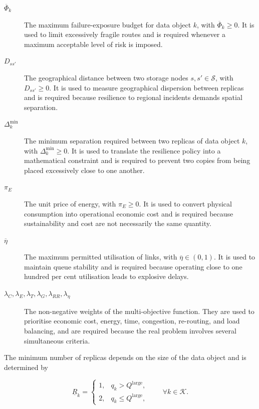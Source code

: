 \documentclass[a4paper,fleqn]{cas-dc}
\newcommand{\Sset}{\mathcal{S}}
\newcommand{\Kset}{\mathcal{K}}
\begin{document}
\begin{description}
\item[\(\overline\Phi_k\)] The maximum failure-exposure budget for data object \(k\), with \(\overline\Phi_k\ge 0\). It is used to limit excessively fragile routes and is required whenever a maximum acceptable level of risk is imposed. 

\item[\(D_{ss'}\)] The geographical distance between two storage nodes \(s,s'\in\Sset\), with \(D_{ss'}\ge 0\). It is used to measure geographical dispersion between replicas and is required because resilience to regional incidents demands spatial separation. 

\item[\(\Delta_k^{\min}\)] The minimum separation required between two replicas of data object \(k\), with \(\Delta_k^{\min}\ge 0\). It is used to translate the resilience policy into a mathematical constraint and is required to prevent two copies from being placed excessively close to one another. 

\item[\(\pi_E\)] The unit price of energy, with \(\pi_E\ge 0\). It is used to convert physical consumption into operational economic cost and is required because sustainability and cost are not necessarily the same quantity. 

\item[\(\overline\eta\)] The maximum permitted utilisation of links, with \(\overline\eta\in(0,1)\). It is used to maintain queue stability and is required because operating close to one hundred per cent utilisation leads to explosive delays. 

\item[\(\lambda_C,\lambda_E,\lambda_T,\lambda_G,\lambda_{RR},\lambda_{\eta}\)] The non-negative weights of the multi-objective function. They are used to prioritise economic cost, energy, time, congestion, re-routing, and load balancing, and are required because the real problem involves several simultaneous criteria. 

\end{description}


The minimum number of replicas depends on the size of the data object and is determined by

\begin{equation}
\underline R_k=
\begin{cases}
1, & q_k > Q^{\mathrm{large}},\\
2, & q_k \le Q^{\mathrm{large}},
\end{cases}
\qquad \forall k\in\Kset.
\end{equation}
\end{document}
